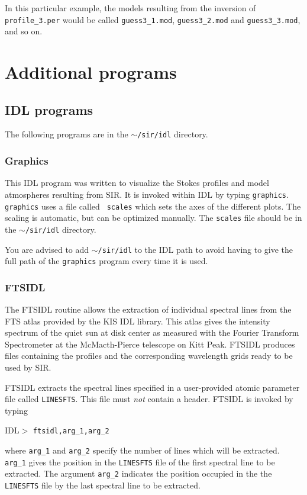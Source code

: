 In this particular example, the models resulting from the inversion
of {\tt profile\_3.per} would be called {\tt guess3\_1.mod}, 
{\tt guess3\_2.mod} and {\tt guess3\_3.mod}, and so on. 


\chapter{Additional programs}

\section{IDL programs}
The following programs are in the {\tt $\sim$/sir/idl} directory.

\subsection{Graphics}
This IDL program was written to visualize the Stokes profiles and
model atmospheres resulting from SIR. It is invoked within IDL 
by typing {\tt graphics}. {\tt graphics} uses a file called {\tt 
scales} which sets the axes of the different plots. The scaling 
is automatic, but can be optimized manually. The {\tt scales} 
file should be in the {\tt $\sim$/sir/idl} directory. 

You are advised to add {\tt $\sim$/sir/idl} to the IDL path to 
avoid having to give the full path of the {\tt graphics} program 
every time it is used.

\subsection{FTSIDL}
The FTSIDL routine allows the extraction of individual spectral lines from
the FTS atlas provided by the KIS IDL library. This atlas gives the intensity 
spectrum of the quiet sun at disk center as measured with the Fourier 
Transform Spectrometer at the McMacth-Pierce telescope on Kitt Peak. 
FTSIDL produces files containing the profiles and the corresponding 
wavelength grids ready to be used by SIR.

FTSIDL extracts the spectral lines specified in a user-provided atomic parameter
file called {\tt LINESFTS}. This file must {\em not} contain a header. 
FTSIDL is invoked by typing
\begin{flushleft}
IDL$>$ {\tt ftsidl,arg\_1,arg\_2 }
\end{flushleft}
where {\tt arg\_1} and {\tt arg\_2} specify the number of lines which
will be extracted. {\tt arg\_1} gives the position in the {\tt LINESFTS} 
file of the first spectral line to be extracted. The argument
{\tt arg\_2} indicates the position occupied in the
the {\tt LINESFTS} file by the last spectral line to be extracted. 

